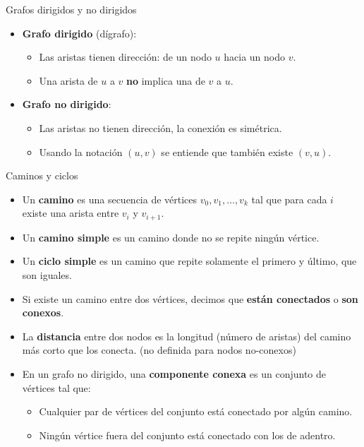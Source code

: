 \documentclass[aspectratio=169]{beamer}
\begin{document}
\begin{frame}{Grafos dirigidos y no dirigidos}
  \begin{itemize}
    \item \textbf{Grafo dirigido} (dígrafo):
      \begin{itemize}
        \item Las aristas tienen dirección: de un nodo \(u\) hacia un nodo \(v\).
        \item Una arista de \(u\) a \(v\) \textbf{no} implica una de \(v\) a \(u\).
      \end{itemize}
    \item \textbf{Grafo no dirigido}:
      \begin{itemize}
        \item Las aristas no tienen dirección, la conexión es simétrica.
        \item Usando la notación \((u, v)\) se entiende que también existe \((v, u)\).
      \end{itemize}
  \end{itemize}
\end{frame}

\begin{frame}{Caminos y ciclos}
  \begin{itemize}
    \item Un \textbf{camino} es una secuencia de vértices \( v_0, v_1, \dots, v_k \) tal que para cada \(i\) existe una arista entre \(v_i\) y \(v_{i+1}\).
    \item Un \textbf{camino simple} es un camino donde no se repite ningún vértice.
    \item Un \textbf{ciclo simple} es un camino que repite solamente el primero y último, que son iguales.
    \item Si existe un camino entre dos vértices, decimos que \textbf{están conectados} o \textbf{son conexos}.
    \item La \textbf{distancia} entre dos nodos es la longitud (número de aristas) del camino más corto que los conecta. (no definida para nodos no-conexos)
    \item En un grafo no dirigido, una \textbf{componente conexa} es un conjunto de vértices tal que:
      \begin{itemize}
        \item Cualquier par de vértices del conjunto está conectado por algún camino.
        \item Ningún vértice fuera del conjunto está conectado con los de adentro.
      \end{itemize}
  \end{itemize}
\end{frame}
\end{document}
